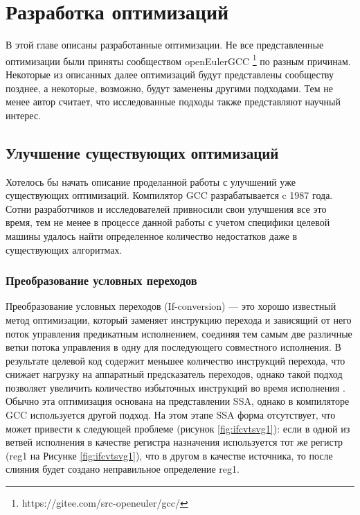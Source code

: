\chapter{Разработка оптимизаций}\label{ch:ch2}

В этой главе описаны разработанные оптимизации. Не все представленные оптимизации были приняты сообществом openEulerGCC \footnote{https://gitee.com/src-openeuler/gcc/} по разным причинам. Некоторые из описанных далее оптимизаций будут представлены сообществу позднее, а некоторые, возможно, будут заменены другими подходами. Тем не менее автор считает, что исследованные подходы также представляют научный интерес.


\section{Улучшение существующих оптимизаций}\label{sec:ch2/sect1}
Хотелось бы начать описание проделанной работы с улучшений уже существующих оптимизаций. Компилятор GCC разрабатывается c 1987 года. Сотни разработчиков и исследователей привносили  свои улучшения все это время, тем не менее в процессе данной работы с учетом специфики целевой машины удалось найти определенное количество недостатков даже в существующих алгоритмах.
 
\subsection{Преобразование условных переходов} \label{opt:ifconv}
Преобразование условных переходов (If-conversion) — это хорошо известный метод оптимизации, который заменяет инструкцию перехода и зависящий от него поток управления предикатным исполнением, соединяя тем самым две различные ветки потока управления в одну для последующего совместного исполнения.  В результате целевой код содержит меньшее количество инструкций перехода, что снижает нагрузку на аппаратный предсказатель переходов, однако такой подход позволяет увеличить количество избыточных инструкций во время исполнения \cite{bruel2021if,E240105}. Обычно эта оптимизация основана на представлении SSA, однако в компиляторе GCC используется другой подход. На этом этапе SSA форма отсутствует, что может привести к следующей проблеме (рисунок \ref{fig:ifcvtsvg1}): если в одной из ветвей исполнения в качестве регистра назначения используется  тот же регистр (reg1 на
Рисунке \ref{fig:ifcvtsvg1}), что в другом в качестве источника, то после слияния будет создано неправильное определение reg1.

